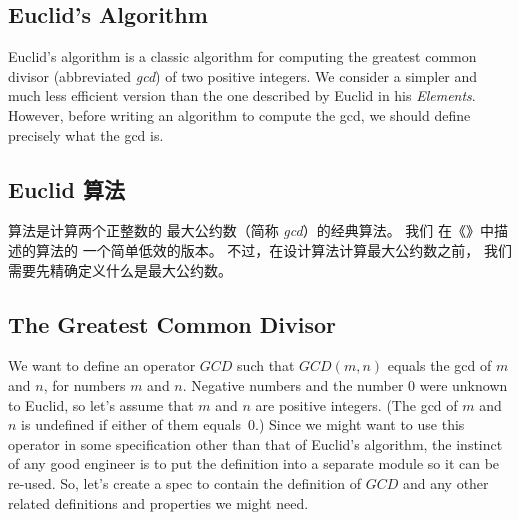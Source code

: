 
\begin{en}
\newpage
{}%
\vspace{-\baselineskip}
\section{Euclid's Algorithm} 

Euclid's algorithm is a classic algorithm 
for computing the greatest common divisor (abbreviated \emph{gcd}) of
two positive integers.  We consider a simpler and much less efficient
version than the one described by Euclid in his \emph{Elements}.
However, before writing an algorithm to compute the gcd, we should
define precisely what the gcd is.

\end{en}

\begin{ch}
  \newpage
  \vspace{-\baselineskip}
  \section{Euclid 算法} 

  \euclid{}算法是计算两个正整数的%
  最大公约数（简称 \emph{gcd}）的经典算法。
  我们 \euclid{} 在《\Elements{}》中描述的算法的
  一个简单低效的版本。
  不过，在设计算法计算最大公约数之前，
  我们需要先精确定义什么是最大公约数。

\end{ch}

  \vspace{-\baselineskip}
\subsection{The Greatest Common Divisor} 

We want to define an operator $GCD$ such that $GCD(m, n)$ equals the
gcd of $m$ and $n$, for numbers $m$ and $n$.  Negative numbers and the
number 0 were unknown to Euclid, so let's assume that $m$ and $n$ are
positive integers.  (The gcd of $m$ and $n$ is undefined if either of
them equals~0.)  Since we might want to use this operator in some
specification other than that of Euclid's algorithm, the instinct of
any good engineer is to put the definition into a separate module so
it can be re-used.
So, let's create a spec to contain the definition of $GCD$ and any
other related definitions and properties we might need.  

